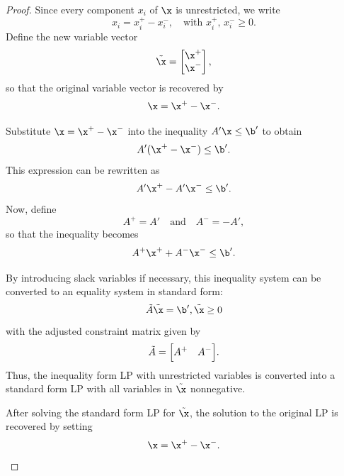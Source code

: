 \begin{proof}
Since every component \(x_i\) of \(\x\) is unrestricted, we write
\[
x_i = x_i^+ - x_i^-, \quad \text{with } x_i^+,\, x_i^- \ge 0.
\]
Define the new variable vector
\[
\tilde{\x} = \begin{bmatrix} \x^+ \\ \x^- \end{bmatrix},
\]
so that the original variable vector is recovered by
\[
\x = \x^+ - \x^-.
\]

Substitute \(\x = \x^+ - \x^-\) into the inequality \(A'\x \le \b'\) to obtain
\[
A'(\x^+ - \x^-) \le \b'.
\]
This expression can be rewritten as
\[
A'\x^+ - A'\x^- \le \b'.
\]
Now, define
\[
A^+ = A' \quad \text{and} \quad A^- = -A',
\]
so that the inequality becomes
\[
A^+ \x^+ + A^- \x^- \le \b'.
\]

By introducing slack variables if necessary, this inequality system can be converted to an equality system in standard form:
\[
\tilde{A}\tilde{\x} = \b',\tilde{\x} \geq 0
\]
with the adjusted constraint matrix given by
\[
\tilde{A} = \Bigl[A^+ \quad A^-\Bigr].
\]
Thus, the inequality form LP with unrestricted variables is converted into a standard form LP with all variables in \(\tilde{\x}\) nonnegative.

After solving the standard form LP for \(\tilde{\x}\), the solution to the original LP is recovered by setting
\[
\x = \x^+ - \x^-.
\]
\end{proof}



